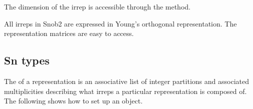 \documentclass[letterpaper,10pt,english]{sphinxmanual}
\begin{document}
\sphinxAtStartPar
The dimension of the irrep is accessible through the  method.

\begin{sphinxVerbatim}[commandchars=\\\{\}]
\end{sphinxVerbatim}

\sphinxAtStartPar
All irreps in Snob2 are expressed in Young’s orthogonal representation. The representation matrices
are easy to access.

\begin{sphinxVerbatim}[commandchars=\\\{\}]
\PYG{p}{[}\PYG{p}{]}
\PYG{p}{[}\PYG{p}{]}
\end{sphinxVerbatim}


\subsection{Sn types}
\label{\detokenize{index:sn-types}}
\sphinxAtStartPar
The  of a representation is an associative list of integer partitions and associated multiplicities
describing what irreps a particular representation is composed of.
The following shows how to set up an  object.

\begin{sphinxVerbatim}[commandchars=\\\{\}]
\PYG{p}{[}\PYG{p}{]}
\PYG{p}{[}\PYG{p}{]}
\PYG{p}{[}\PYG{p}{]}
\end{sphinxVerbatim}
\end{document}
